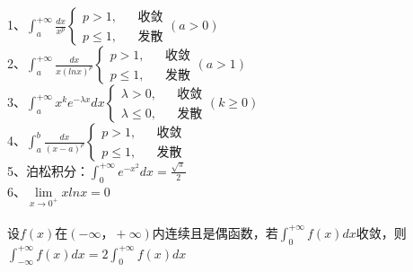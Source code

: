 \documentclass{article}
\begin{document}
\begin{flushleft}
	1、$\int_{a}^{+\infty}\frac{dx}{x^p}\left\{
	\begin{array}{rcl}
	p>1,& & \mbox{收敛}\\
	p\le 1,& & \mbox{发散}
	\end{array} \right.(a>0)$\\
	2、$\int_{a}^{+\infty}\frac{dx}{x(lnx)^p}\left\{
	\begin{array}{rcl}
	p>1,& & \mbox{收敛}\\
	p\le 1,& & \mbox{发散}
	\end{array} \right.(a>1)$\\
	3、$\int_{a}^{+\infty}x^ke^{-\lambda x}dx\left\{
	\begin{array}{rcl}
	\lambda>0,& & \mbox{收敛}\\
	\lambda\le 0,& & \mbox{发散}
	\end{array} \right.(k\ge 0)$\\
	4、$\int_{a}^{b}\frac{dx}{(x-a)^p}\left\{
	\begin{array}{rcl}
	p>1,& & \mbox{收敛}\\
	p\le 1,& & \mbox{发散}
	\end{array} \right.$\\
	5、泊松积分：$\int_{0}^{+\infty}e^{-x^2}dx=\frac{\sqrt{\pi}}{2}$\\
	6、$\lim\limits_{x\to 0^+}xlnx=0$\\
	~\\
	设$f(x)$在$(-\infty，+\infty)$内连续且是偶函数，若$\int_{0}^{+\infty}f(x)dx$收敛，则$\int_{-\infty}^{+\infty}f(x)dx=2\int_{0}^{+\infty}f(x)dx$\\
	
\end{flushleft}
\end{document}
